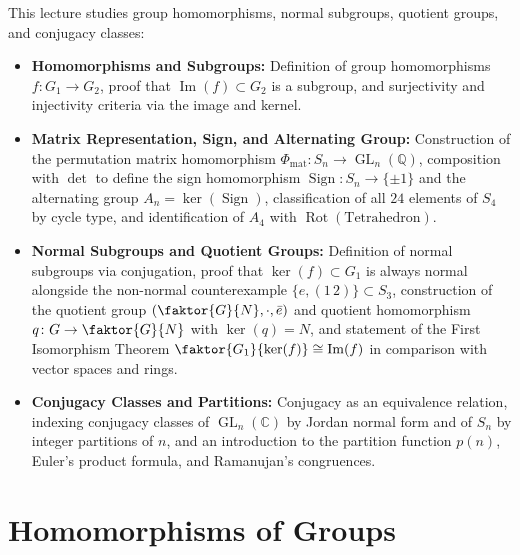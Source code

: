 \begin{overview}
This lecture studies group homomorphisms, normal subgroups, quotient groups, and conjugacy classes:
\begin{itemize}
    \item \textbf{Homomorphisms and Subgroups:} Definition of group homomorphisms $f \colon G_1 \to G_2$, proof that $\operatorname{Im}(f) \subset G_2$ is a subgroup, and surjectivity and injectivity criteria via the image and kernel.
    \item \textbf{Matrix Representation, Sign, and Alternating Group:} Construction of the permutation matrix homomorphism $\Phi_{\text{mat}} \colon S_n \to \operatorname{GL}_n(\mathbb{Q})$, composition with $\det$ to define the sign homomorphism $\operatorname{Sign} \colon S_n \to \{\pm 1\}$ and the alternating group $A_n = \ker(\operatorname{Sign})$, classification of all $24$ elements of $S_4$ by cycle type, and identification of $A_4$ with $\operatorname{Rot}(\text{Tetrahedron})$.
    \item \textbf{Normal Subgroups and Quotient Groups:} Definition of normal subgroups via conjugation, proof that $\ker(f) \subset G_1$ is always normal alongside the non-normal counterexample $\{e, (1\,2)\} \subset S_3$, construction of the quotient group $(\faktor{G}{N}, \cdot, \bar{e})$ and quotient homomorphism $q \colon G \to \faktor{G}{N}$ with $\ker(q) = N$, and statement of the First Isomorphism Theorem $\faktor{G_1}{\ker(f)} \cong \operatorname{Im}(f)$ in comparison with vector spaces and rings.
    \item \textbf{Conjugacy Classes and Partitions:} Conjugacy as an equivalence relation, indexing conjugacy classes of $\operatorname{GL}_n(\mathbb{C})$ by Jordan normal form and of $S_n$ by integer partitions of $n$, and an introduction to the partition function $p(n)$, Euler's product formula, and Ramanujan's congruences.
\end{itemize}
\end{overview}

\section{Homomorphisms of Groups}


